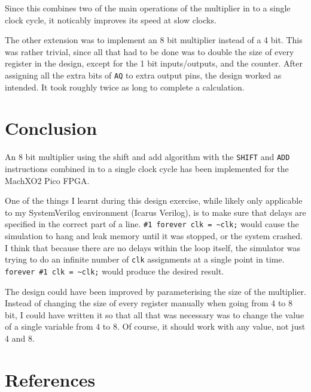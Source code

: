 \documentclass[a4paper,11pt]{article}
\begin{document}
Since this combines two of the main operations of the multiplier in to a single clock cycle, it noticably improves its speed at slow clocks.

The other extension was to implement an 8 bit multiplier instead of a 4 bit. This was rather trivial, since all that had to be done was to double the size of every register in the design, except for the 1 bit inputs/outputs, and the counter. After assigning all the extra bits of \lstinline{AQ} to extra output pins, the design worked as intended. It took roughly twice as long to complete a calculation.

\section{Conclusion}

An 8 bit multiplier using the shift and add algorithm with the \lstinline{SHIFT} and \lstinline{ADD} instructions combined in to a single clock cycle has been implemented for the MachXO2 Pico FPGA.

One of the things I learnt during this design exercise, while likely only applicable to my SystemVerilog environment (Icarus Verilog), is to make sure that delays are specified in the correct part of a line. \lstinline{#1 forever clk = ~clk;} would cause the simulation to hang and leak memory until it was stopped, or the system crashed. I think that because there are no delays within the loop itself, the simulator was trying to do an infinite number of \lstinline{clk} assignments at a single point in time. \lstinline{forever #1 clk = ~clk;} would produce the desired result.

The design could have been improved by parameterising the size of the multiplier. Instead of changing the size of every register manually when going from 4 to 8 bit, I could have written it so that all that was necessary was to change the value of a single variable from 4 to 8. Of course, it should work with any value, not just 4 and 8.

\section{References}


  
\end{document}
